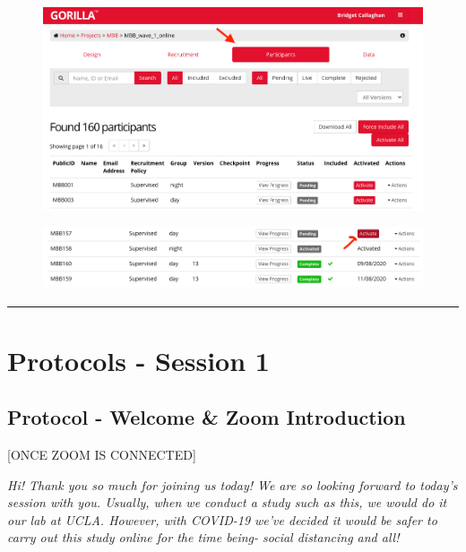 \documentclass[]{book}
\begin{document}
\begin{figure}
\centering
\includegraphics{images/gorilla/4.png}
\caption{}
\end{figure}

\begin{figure}
\centering
\includegraphics{images/gorilla/5.png}
\caption{}
\end{figure}

\begin{center}\rule{0.5\linewidth}{0.5pt}\end{center}

\hypertarget{protocols---session-1}{%
\section{Protocols - Session 1}\label{protocols---session-1}}

\hypertarget{protocol---welcome-zoom-introduction}{%
\subsection{Protocol - Welcome \& Zoom Introduction}\label{protocol---welcome-zoom-introduction}}

{[}ONCE ZOOM IS CONNECTED{]}

\emph{Hi! Thank you so much for joining us today! We are so looking forward to today's session with you. Usually, when we conduct a study such as this, we would do it our lab at UCLA. However, with COVID-19 we've decided it would be safer to carry out this study online for the time being- social distancing and all!}
\end{document}
